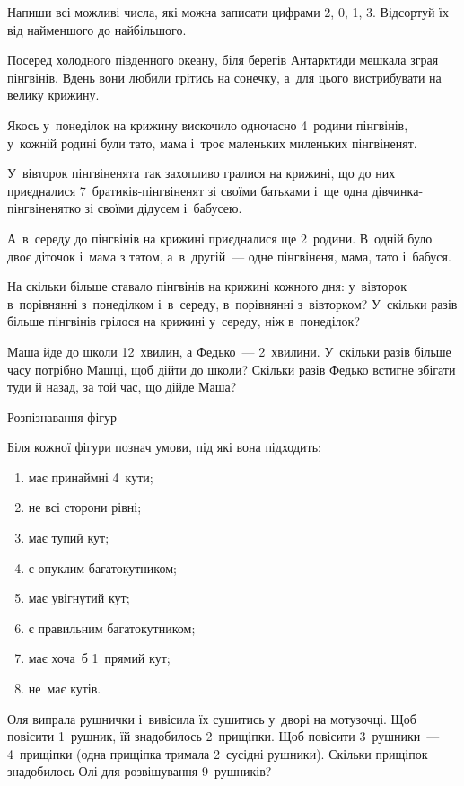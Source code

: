 \problem
Напиши всі можливі числа, які можна записати цифрами 2, 0, 1, 3.
Відсортуй їх від найменшого до найбільшого.


\problem
Посеред холодного південного океану, біля берегів Антарктиди мешкала
зграя пінгвінів. Вдень вони любили грітись на сонечку, а~для цього
вистрибувати на велику крижину.

Якось у~понеділок на крижину вискочило одночасно 4~родини пінгвінів,
у~кожній родині були тато, мама і~троє маленьких миленьких пінгвіненят.

У~вівторок пінгвіненята так захопливо гралися на крижині,
що до них приєдналися 7~братиків-пінгвіненят зі своїми батьками
і~ще одна дівчинка-пінгвіненятко зі своїми дідусем і~бабусею.

А~в~середу до пінгвінів на крижині приєдналися ще 2~родини.
В~одній було двоє діточок і~мама з татом, а~в~другій~--- 
одне пінгвіненя, мама, тато і~бабуся.

На скільки більше ставало пінгвінів на крижині кожного дня:
у~вівторок в~порівнянні з~понеділком і~в~середу, в~порівнянні з~вівторком?
У~скільки разів більше пінгвінів грілося на крижині у~середу, ніж в~понеділок?


\problem
Маша йде до школи 12~хвилин, а Федько~--- 2~хвилини.
У~скільки разів більше часу потрібно Машці, щоб дійти до школи?
Скільки разів Федько встигне збігати туди й назад, за той час, що дійде Маша?


\problem
Розпізнавання фігур

Біля кожної фігури познач умови, під які вона підходить:
\begin{enumerate}
    \item має принаймні 4~кути;
    \item не всі сторони рівні;
    \item має тупий кут;
    \item є опуклим багатокутником;
    \item має увігнутий кут;
    \item є правильним багатокутником;
    \item має хоча~б 1~прямий кут;
    \item не~має кутів.
\end{enumerate}


\problem
Оля випрала рушнички і~вивісила їх сушитись у~дворі на мотузочці.
Щоб повісити 1~рушник, їй знадобилось 2~прищіпки.
Щоб повісити 3~рушники~--- 4~прищіпки (одна прищіпка тримала 2~сусідні рушники).
Скільки прищіпок знадобилось Олі для розвішування 9~рушників?


